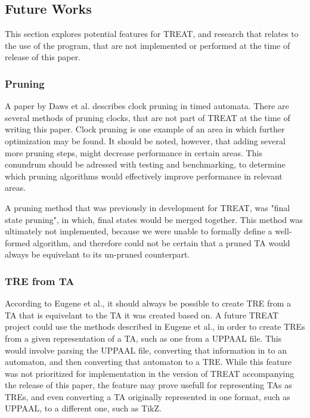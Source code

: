 \subsection{Future Works}\label{subsec:futureWorks}
This section explores potential features for TREAT, and research that relates to the use of the program, that are not implemented or performed at the time of release of this paper.

\subsubsection{Pruning}\label{futureWorks:pruning}
A paper by Daws et al. \cite{Daws1996} describes clock pruning in timed automata. There are several methods of pruning clocks, that are not part of TREAT at the time of writing this paper.
Clock pruning is one example of an area in which further optimization may be found. It should be noted, however, that adding several more pruning steps, might decrease performance in certain areas.
This conundrum should be adressed with testing and benchmarking, to determine which pruning algorithms would effectively improve performance in relevant areas.

A pruning method that was previously in development for TREAT, was "final state pruning", in which, final states would be merged together. This method was ultimately not implemented, because we were unable to formally define a well-formed algorithm, and therefore could not be certain that a pruned TA would always be equivelant to its un-pruned counterpart.


\subsubsection{TRE from TA}
According to Eugene et al.,\cite{Eugene2001} it should always be possible to create TRE from a TA that is equivelant to the TA it was created based on.
A future TREAT project could use the methods described in Eugene et al., in order to create TREs from a given representation of a TA, such as one from a UPPAAL file.
This would involve parsing the UPPAAL file, converting that information in to an automaton, and then converting that automaton to a TRE.
While this feature was not prioritized for implementation in the version of TREAT accompanying the release of this paper, the feature may prove usefull for representing TAs as TREs, and even converting a TA originally represented in one format, such as UPPAAL, to a different one, such as TikZ.

